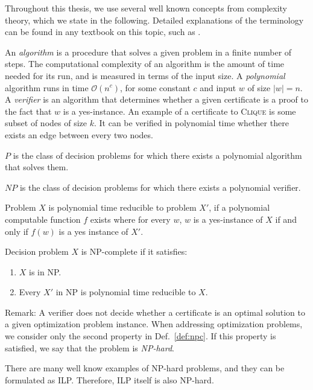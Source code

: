 Throughout this thesis, we use several well known concepts from complexity theory, which we state in the following.
Detailed explanations of the terminology can be found in any textbook on this topic, such as \cite{sipser06}.

An \emph{algorithm} is a procedure that solves a given problem in a finite number of steps.
The computational complexity of an algorithm is the amount of time needed for its run, and is measured in terms of the input size.
A \emph{polynomial} algorithm runs in time $\mathcal{O}(n^c)$, for some constant $c$ and input $w$ of size $|w|=n$.
A \emph{verifier} is an algorithm that determines whether a given certificate is a proof to the fact that $w$ is a yes-instance.
An example of a certificate to \textsc{Clique} is some subset of nodes of size $k$.
It can be verified in polynomial time whether there exists an edge between every two nodes.
\begin{definition}
	$P$ is the class of decision problems for which there exists a polynomial algorithm that solves them.
\end{definition}
\begin{definition}
	$NP$ is the class of decision problems for which there exists a polynomial verifier. 
\end{definition}
\begin{definition}
	Problem $X$ is polynomial time reducible to problem $X'$, if a polynomial computable function $f$ exists where for every $w$, 
	$w$ is a yes-instance of $X$ if and only if $f(w)$ is a yes instance of $X'$.
\end{definition}
\begin{definition}\label{def:npc}
	Decision problem $X$ is NP-complete if it satisfies:
	\begin{enumerate}
		\item $X$ is in NP.
		\item Every $X'$ in NP is polynomial time reducible to $X$.
	\end{enumerate}
\end{definition}
Remark:
A verifier does not decide whether a certificate is an optimal solution to a given optimization problem instance. 
When addressing optimization problems, we consider only the second property in Def.~\ref{def:npc}. 
If this property is satisfied, we say that the problem is \emph{NP-hard}.

There are many well know examples of NP-hard problems, and they can be formulated as ILP.
Therefore, ILP itself is also NP-hard.

